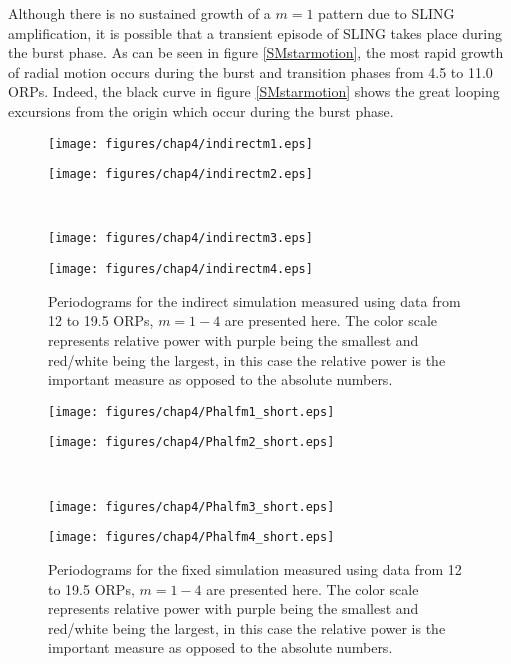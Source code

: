 Although there is no sustained growth of a $m = 1$ pattern due to SLING amplification, it is possible that a transient episode of SLING takes place during the burst phase. As can be seen in figure \ref{SMstarmotion}, the most rapid growth of radial motion occurs during the burst and transition phases from 4.5 to 11.0 ORPs. Indeed, the black curve in figure \ref{SMstarmotion} shows the great looping excursions from the origin which occur during the burst phase. 
\begin{figure}[p]
\begin{minipage}[t]{3.15in}
\texttt{[image: figures/chap4/indirectm1.eps]}
\end{minipage}
\hfill
\begin{minipage}[t]{3.15in}
\texttt{[image: figures/chap4/indirectm2.eps]}
\end{minipage}\\
\begin{minipage}[b]{3.15in}
\texttt{[image: figures/chap4/indirectm3.eps]}
\end{minipage}
\hfill
\begin{minipage}[b]{3.15in}
\texttt{[image: figures/chap4/indirectm4.eps]}
\end{minipage}
\caption[Indirect simulation periodograms for $m = 1-4$]{Periodograms for the indirect simulation measured using data from 12 to 19.5 ORPs, $m = 1-4$ are presented here. The color scale represents relative power with purple being the smallest  and red/white being the largest, in this case the relative power is the important measure as opposed to the absolute numbers.}
\label{SMindirectperiod}
\end{figure}
\begin{figure}[p]
\begin{minipage}[t]{3.15in}
\texttt{[image: figures/chap4/Phalfm1\_short.eps]}
\end{minipage}
\hfill
\begin{minipage}[t]{3.15in}
\texttt{[image: figures/chap4/Phalfm2\_short.eps]}
\end{minipage}\\
\begin{minipage}[b]{3.15in}
\texttt{[image: figures/chap4/Phalfm3\_short.eps]}
\end{minipage}
\hfill
\begin{minipage}[b]{3.15in}
\texttt{[image: figures/chap4/Phalfm4\_short.eps]}
\end{minipage}
\caption[Fixed simulation periodograms for $m = 1-4$]{Periodograms for the fixed simulation measured using data from 12 to 19.5 ORPs, $m = 1-4$ are presented here. The color scale represents relative power with purple being the smallest  and red/white being the largest, in this case the relative power is the important measure as opposed to the absolute numbers.}
\label{SMfixedperiod}
\end{figure}


